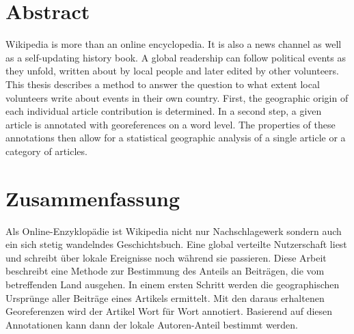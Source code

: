 \begingroup
\let\clearpage\relax
\let\cleardoublepage\relax
\let\cleardoublepage\relax

\chapter*{Abstract}


Wikipedia is more than an online encyclopedia. 
It is also a news channel as well as a self-updating history book.
A global readership can follow political events as they unfold, written about by local people and later edited by other volunteers.
This thesis describes a method to answer the question to what extent local volunteers write about events in their own country.
First, the geographic origin of each individual article contribution is determined.
In a second step, a given article is annotated with georeferences on a word level.
The properties of these annotations then allow for a statistical geographic analysis of a single article or a category of articles.

\vfill

\chapter*{Zusammenfassung}


Als Online-Enzyklopädie ist Wikipedia nicht nur Nachschlagewerk sondern auch ein sich stetig wandelndes Geschichtsbuch. 
Eine global verteilte Nutzerschaft liest und schreibt über lokale Ereignisse noch während sie passieren. 
Diese Arbeit beschreibt eine Methode zur Bestimmung des Anteils an Beitr\"agen, die vom betreffenden Land ausgehen.
In einem ersten Schritt werden die geographischen Urspr\"unge aller Beitr\"age eines Artikels ermittelt.
Mit den daraus erhaltenen Georeferenzen wird der Artikel Wort f\"ur Wort annotiert.
Basierend auf diesen Annotationen kann dann der lokale Autoren-Anteil bestimmt werden.
\endgroup			

\vfill